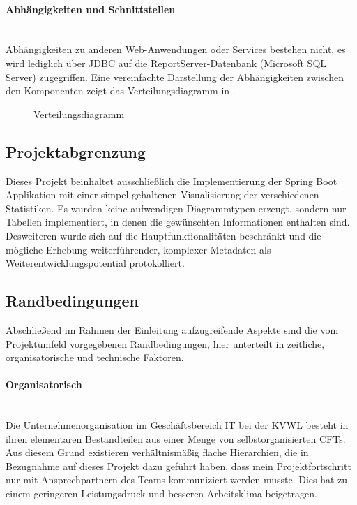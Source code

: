 \paragraph{Abhängigkeiten und Schnittstellen}~\\\label{p:Abhaengigkeiten}
Abhängigkeiten zu anderen Web-Anwendungen oder Services bestehen nicht, es wird lediglich über \ac{JDBC} auf die ReportServer-Datenbank (Microsoft SQL Server) zugegriffen. Eine vereinfachte Darstellung der Abhängigkeiten zwischen den Komponenten zeigt das Verteilungsdiagramm in .
\begin{figure}[htb]
	\centering
	\caption{Verteilungsdiagramm}
	\label{fig:Deployment}
\end{figure}

\subsection{Projektabgrenzung}\label{sec:Projektabgrenzung}
Dieses Projekt beinhaltet ausschließlich die Implementierung der Spring Boot Applikation mit einer simpel gehaltenen Visualisierung der verschiedenen Statistiken. Es wurden keine aufwendigen Diagrammtypen erzeugt, sondern nur Tabellen implementiert, in denen die gewünschten Informationen enthalten sind.
Desweiteren wurde sich auf die Hauptfunktionalitäten beschränkt und die mögliche Erhebung weiterführender, komplexer Metadaten als Weiterentwicklungspotential protokolliert.

\subsection{Randbedingungen}\label{sec:Randbedingungen}
Abschließend im Rahmen der Einleitung aufzugreifende Aspekte sind die vom Projektumfeld vorgegebenen Randbedingungen, hier unterteilt in zeitliche, organisatorische und technische Faktoren.

\paragraph{Organisatorisch}~\\\label{p:Randbedingungen:Organisatorisch}
Die Unternehmenorganisation im Geschäftsbereich IT bei der \ac{KVWL} besteht in ihren elementaren Bestandteilen aus einer Menge von selbstorganisierten \ac{CFT}s. Aus diesem Grund existieren verhältnismäßig flache Hierarchien, die in Bezugnahme auf dieses Projekt dazu geführt haben, dass mein Projektfortschritt nur mit Ansprechpartnern des Teams kommuniziert werden musste. Dies hat zu einem geringeren Leistungsdruck und besseren Arbeitsklima beigetragen.

